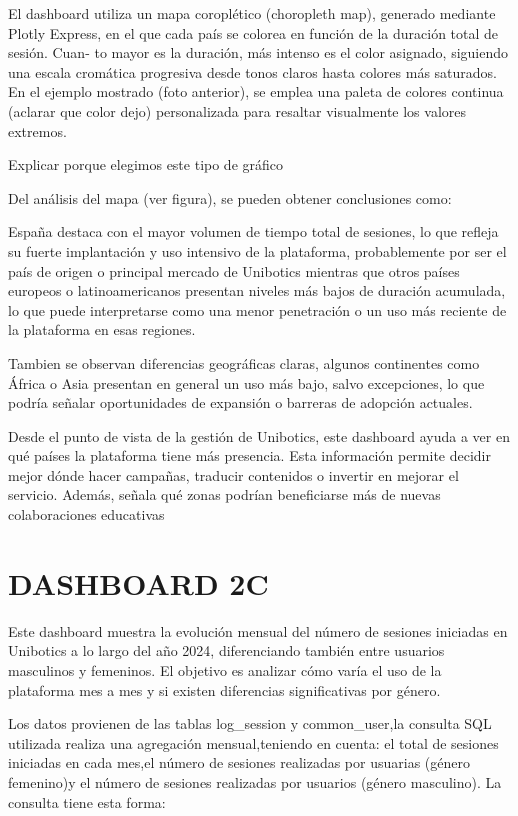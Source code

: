 \documentclass[a4paper, 12pt]{book}
\begin{document}
El dashboard utiliza un mapa coroplético (choropleth map), generado mediante Plotly
Express, en el que cada país se colorea en función de la duración total de sesión. Cuan-
to mayor es la duración, más intenso es el color asignado, siguiendo una escala cromática
progresiva desde tonos claros hasta colores más saturados. En el ejemplo mostrado (foto
anterior), se emplea una paleta de colores continua (aclarar que color dejo) personalizada
para resaltar visualmente los valores extremos.

Explicar porque elegimos este tipo de gráfico

Del análisis del mapa (ver figura), se pueden obtener conclusiones como:

España destaca con el mayor volumen de tiempo total de sesiones, lo que refleja su fuerte implantación y uso intensivo de la plataforma, probablemente por ser el país de origen o principal mercado de Unibotics mientras que otros países europeos o latinoamericanos presentan niveles más bajos de duración acumulada, lo que puede interpretarse como una menor penetración o un uso más reciente de la plataforma en esas regiones.

Tambien se observan diferencias geográficas claras, algunos continentes como África o Asia presentan en general un uso más bajo, salvo excepciones, lo que podría señalar oportunidades de expansión o barreras de adopción actuales.

Desde el punto de vista de la gestión de Unibotics, este dashboard ayuda a ver en qué países la plataforma tiene más presencia. Esta información permite decidir mejor dónde hacer campañas, traducir contenidos o invertir en mejorar el servicio. Además, señala qué zonas podrían beneficiarse más de nuevas colaboraciones educativas

\section{DASHBOARD 2C}

Este dashboard muestra la evolución mensual del número de sesiones iniciadas en Unibotics a lo largo del año 2024, diferenciando también entre usuarios masculinos y femeninos. El objetivo es analizar cómo varía el uso de la plataforma mes a mes y si existen diferencias significativas por género.

Los datos provienen de las tablas log\_session y common\_user,la consulta SQL utilizada realiza una agregación mensual,teniendo en cuenta: el total de sesiones iniciadas en cada mes,el número de sesiones realizadas por usuarias (género femenino)y el número de sesiones realizadas por usuarios (género masculino).
La consulta tiene esta forma:
\end{document}
